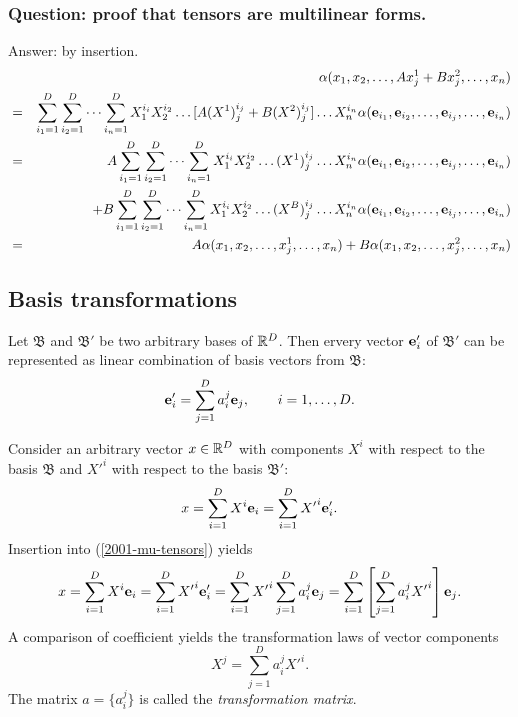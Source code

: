 \subsubsection{Question: proof that tensors are multilinear forms.}
{Answer:}
by insertion.
\begin{eqnarray}
&&\alpha ( x_1,x_2,\ldots , Ax^1_j+Bx_j^2,\ldots ,x_n)
\nonumber \\
&=&
\sum_{i_1=1}^D
\sum_{i_2=1}^D
\cdots
\sum_{i_n=1}^D
X^{i_i}_1X^{i_2}_2\ldots  [A(X^1)^{i_j}_j+B(X^2)^{i_j}_j]\ldots X^{i_n}_n
\alpha ( {\bf e}_{i_1},{\bf e}_{i_2},\ldots,{\bf e}_{i_j},\ldots ,{\bf e}_{i_n})
\nonumber \\
&=& A
\sum_{i_1=1}^D
\sum_{i_2=1}^D
\cdots
\sum_{i_n=1}^D
X^{i_i}_1X^{i_2}_2\ldots  (X^1)^{i_j}_j\ldots X^{i_n}_n
\alpha ( {\bf e}_{i_1},{\bf e}_{i_2},\ldots,{\bf e}_{i_j},\ldots ,{\bf e}_{i_n})
\nonumber \\
&&\quad +
B
\sum_{i_1=1}^D
\sum_{i_2=1}^D
\cdots
\sum_{i_n=1}^D
X^{i_i}_1X^{i_2}_2\ldots  (X^B)^{i_j}_j\ldots X^{i_n}_n
\alpha ( {\bf e}_{i_1},{\bf e}_{i_2},\ldots,{\bf e}_{i_j},\ldots ,{\bf e}_{i_n})
\nonumber \\
&=& A \alpha ( x_1,x_2,\ldots , x^1_j,\ldots ,x_n)+
B \alpha ( x_1,x_2,\ldots , x_j^2,\ldots ,x_n)\nonumber
\end{eqnarray}

\subsection{Basis transformations}
Let
${\mathfrak B}$
and
${\mathfrak B'}$
be two arbitrary bases of
${\Bbb R}^D$.
Then ervery vector ${\bf e}'_i$ of
${\mathfrak B'}$
can be represented as linear combination of basis vectors from
${\mathfrak B}$:
\begin{equation}
{\bf e}'_i=\sum_{j=1}^D a_i^j {\bf e}_j, \qquad i=1,\ldots , D .
\label{2001-mu-tensors}
\end{equation}

Consider an arbitrary vector $x\in {\Bbb R}^D$
with components $X^i$ with respect to the basis
${\mathfrak B}$
and   ${X'}^i$  with respect to the basis
${\mathfrak B'}$:
\begin{equation}
x
=\sum_{i=1}^D X^i {\bf e}_i
=\sum_{i=1}^D {X'}^i {\bf e}'_i
.
\end{equation}
Insertion into (\ref{2001-mu-tensors}) yields
\begin{equation}
x
=\sum_{i=1}^D X^i {\bf e}_i
=\sum_{i=1}^D {X'}^i {\bf e}'_i
=\sum_{i=1}^D {X'}^i \sum_{j=1}^D a_i^j {\bf e}_j=
\sum_{i=1}^D\left[\sum_{j=1}^D a_i^j{X'}^i \right] {\bf e}_j.
\end{equation}
A comparison of coefficient yields the transformation laws of vector components
\begin{equation}
X^j   = \sum_{j=1}^D a_i^j{X'}^i.
\end{equation}
The matrix $a=\{a_i^j\}$ is called the {\em transformation matrix}.

